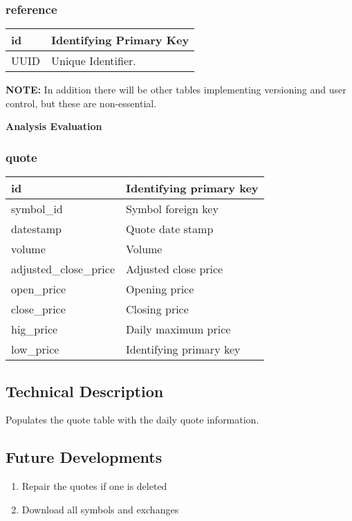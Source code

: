 \subsubsection{reference}
\begin{tabular}{|l||l|}
	\hline
	id						& Identifying Primary Key \\ \hline
	UUID					& Unique Identifier. \\ \hline
\end{tabular}

\textbf{NOTE:} In addition there will be other tables implementing versioning and user control, but these are non-essential.



\par \textbf{Analysis Evaluation}
\subsubsection{quote}
\begin{tabular}{|l||l|}
	\hline
	id 						& Identifying primary key \\ \hline
	symbol\_id				& Symbol foreign key \\ \hline
	datestamp				& Quote date stamp \\ \hline
	volume					& Volume \\ \hline
	adjusted\_close\_price	& Adjusted close price \\ \hline
	open\_price				& Opening price \\ \hline
	close\_price				& Closing price \\ \hline
	hig\_price				& Daily maximum price \\ \hline
	low\_price				& Identifying primary key \\ \hline
\end{tabular}
\subsection{Technical Description}
Populates the quote table with the daily quote information.
\subsection{Future Developments}
\begin{enumerate}
	\item Repair the quotes if one is deleted
	\item Download all symbols and exchanges
\end{enumerate}
